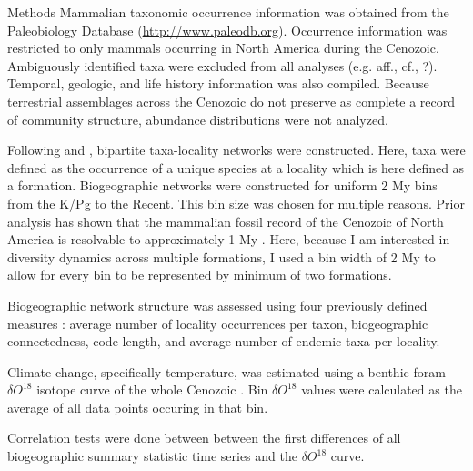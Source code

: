 \documentclass[final]{beamer}\usepackage[]{graphicx}\usepackage[]{color}
\newlength{\onecolwid}
\begin{document}
\begin{frame}[t]
\begin{columns}[t]
\begin{column}{\onecolwid}
      \begin{footnotesize}
      \begin{block}{Methods}
        Mammalian taxonomic occurrence information was obtained from the Paleobiology Database (\url{http://www.paleodb.org}). Occurrence information was restricted to only mammals occurring in North America during the Cenozoic. Ambiguously identified taxa were excluded from all analyses (e.g. aff., cf., ?). Temporal, geologic, and life history information was also compiled. Because terrestrial assemblages across the Cenozoic do not preserve as complete a record of community structure, abundance distributions were not analyzed.

        Following \citet{Sidor2013} and \citet{Vilhena2013}, bipartite taxa-locality networks were constructed. Here, taxa were defined as the occurrence of a unique species at a locality which is here defined as a formation. Biogeographic networks were constructed for uniform 2 My bins from the K/Pg to the Recent. This bin size was chosen for multiple reasons. Prior analysis has shown that the mammalian fossil record of the Cenozoic of North America is resolvable to approximately 1 My \citep{Alroy1996a,Alroy2000g}. Here, because I am interested in diversity dynamics across multiple formations, I used a bin width of 2 My to allow for every bin to be represented by minimum of two formations.

        Biogeographic network structure was assessed using four previously defined measures \citep{Sidor2013}: average number of locality occurrences per taxon, biogeographic connectedness, code length, and average number of endemic taxa per locality. 

        Climate change, specifically temperature, was estimated using a benthic foram \(\delta O^{18}\) isotope curve of the whole Cenozoic \citep{Zachos2008}. Bin \(\delta O^{18}\) values were calculated as the average of all data points occuring in that bin.

        Correlation tests were done between between the first differences of all biogeographic summary statistic time series and the \(\delta O^{18}\) curve. 

      \end{block}
      \end{footnotesize}

    \end{column}


\end{columns}
\end{frame}
\end{document}
